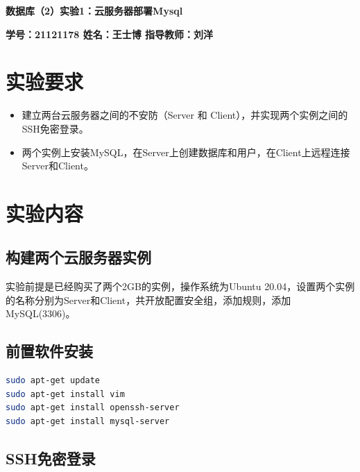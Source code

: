 \documentclass{article}
\begin{document}
 \pingfang
\begin{center}
    \textbf{\huge 数据库（2）实验1：云服务器部署Mysql}
\end{center}
\begin{center}
    \textbf{\large \textbf{学号：21121178 \quad 姓名：王士博 \quad 指导教师：刘洋}}
\end{center}
\hrulefill
\section{实验要求}
\begin{itemize}
  \item 建立两台云服务器之间的不安防（Server 和 Client），并实现两个实例之间的SSH免密登录。
  \item 两个实例上安装MySQL，在Server上创建数据库和用户，在Client上远程连接Server和Client。
\end{itemize}
\section{实验内容}
\subsection{构建两个云服务器实例}
实验前提是已经购买了两个2GB的实例，操作系统为Ubuntu 20.04，设置两个实例的名称分别为Server和Client，共开放配置安全组，添加规则，添加MySQL(3306)。
\subsection{前置软件安装}
\begin{lstlisting}[language=bash]
sudo apt-get update
sudo apt-get install vim
sudo apt-get install openssh-server
sudo apt-get install mysql-server
\end{lstlisting}
\subsection{SSH免密登录}
\end{document}
